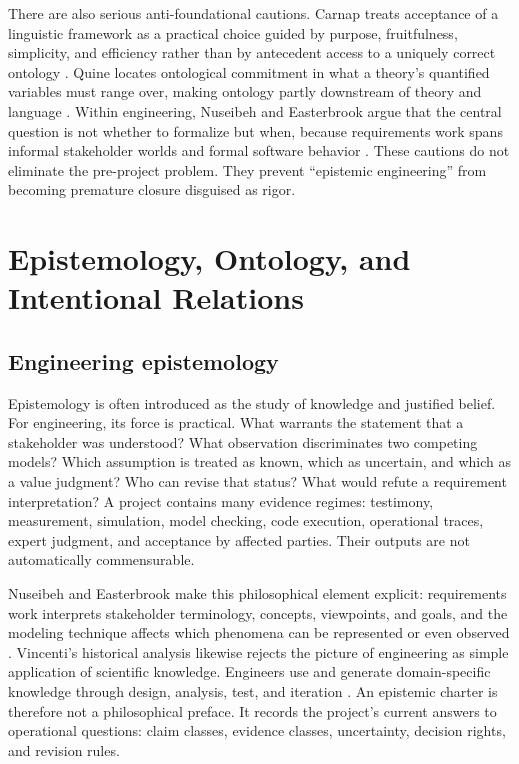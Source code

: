 \documentclass[10pt,a4paper]{article}
\begin{document}
There are also serious anti-foundational cautions. Carnap treats acceptance of a linguistic framework as a practical choice guided by purpose, fruitfulness, simplicity, and efficiency rather than by antecedent access to a uniquely correct ontology \cite{carnap1950}. Quine locates ontological commitment in what a theory's quantified variables must range over, making ontology partly downstream of theory and language \cite{quine1948}. Within engineering, Nuseibeh and Easterbrook argue that the central question is not whether to formalize but when, because requirements work spans informal stakeholder worlds and formal software behavior \cite{nuseibeh2000}. These cautions do not eliminate the pre-project problem. They prevent ``epistemic engineering'' from becoming premature closure disguised as rigor.

\section{Epistemology, Ontology, and Intentional Relations}

\subsection{Engineering epistemology}

Epistemology is often introduced as the study of knowledge and justified belief. For engineering, its force is practical. What warrants the statement that a stakeholder was understood? What observation discriminates two competing models? Which assumption is treated as known, which as uncertain, and which as a value judgment? Who can revise that status? What would refute a requirement interpretation? A project contains many evidence regimes: testimony, measurement, simulation, model checking, code execution, operational traces, expert judgment, and acceptance by affected parties. Their outputs are not automatically commensurable.

Nuseibeh and Easterbrook make this philosophical element explicit: requirements work interprets stakeholder terminology, concepts, viewpoints, and goals, and the modeling technique affects which phenomena can be represented or even observed \cite{nuseibeh2000}. Vincenti's historical analysis likewise rejects the picture of engineering as simple application of scientific knowledge. Engineers use and generate domain-specific knowledge through design, analysis, test, and iteration \cite{vincenti1990}. An epistemic charter is therefore not a philosophical preface. It records the project's current answers to operational questions: claim classes, evidence classes, uncertainty, decision rights, and revision rules.
\end{document}
